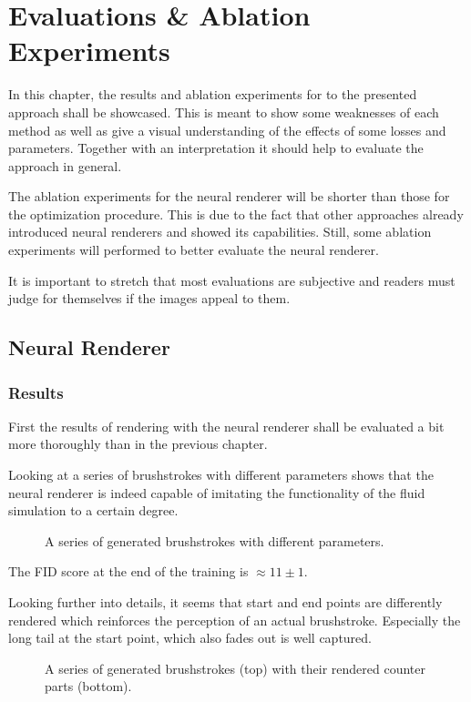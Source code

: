 \setchapterpreamble[u]{\margintoc}
\chapter{Evaluations \& Ablation Experiments}

In this chapter, the results and ablation experiments for to the presented approach shall be showcased.
This is meant to show some weaknesses of each method as well as give a visual understanding of the effects of some losses and parameters.
Together with an interpretation it should help to evaluate the approach in general.

The ablation experiments for the neural renderer will be shorter than those for the optimization procedure.
This is due to the fact that other approaches already introduced neural renderers and showed its capabilities.
Still, some ablation experiments will performed to better evaluate the neural renderer.

It is important to stretch that most evaluations are subjective and readers must judge for themselves if the images appeal to them.

\section{Neural Renderer}
\subsection{Results}
First the results of rendering with the neural renderer shall be evaluated a bit more thoroughly than in the previous chapter.

Looking at a series of brushstrokes with different parameters shows that the neural renderer is indeed capable of imitating the functionality of the fluid simulation to a certain degree.
\begin{figure*}
    \caption[]{A series of generated brushstrokes with different parameters.}
\end{figure*}
The FID score at the end of the training is $\approx 11 \pm 1$.

Looking further into details, it seems that start and end points are differently rendered which reinforces the perception of an actual brushstroke.
Especially the long tail at the start point, which also fades out is well captured.
\begin{figure*}
    \caption[]{A series of generated brushstrokes (top) with their rendered counter parts (bottom).}
\end{figure*}

